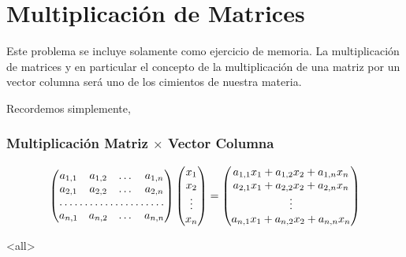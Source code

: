 \section{Multiplicación de Matrices}


Este problema se incluye solamente como 
ejercicio de memoria. La multiplicación de matrices
y en particular el concepto de la multiplicación 
de una matriz por un vector columna será uno de 
los cimientos de nuestra materia. 

Recordemos simplemente, 

\mode*
\begin{frame}[label=FrameEquationMatMul]
  \frametitle<presentation>{Multiplicación Matriz $\times$ Vector Columna}

  \begin{equation}
    \begin{pmatrix}
      a_{1,1} & a_{1,2} & \dots & a_{1,n}  \\
	   a_{2,1} & a_{2,2} & \dots & a_{2,n} \\
	   \hdotsfor{4} \\
	   a_{n,1} & a_{n,2} & \dots & a_{n,n} 
    \end{pmatrix}
    \begin{pmatrix}
      x_{1} \\ x_{2} \\ \vdots \\ x_n 
    \end{pmatrix}
  =
    \begin{pmatrix}
      a_{1,1} x_1 +  a_{1,2} x_2 +  a_{1,n} x_n  \\
      a_{2,1} x_1 +  a_{2,2} x_2 +  a_{2,n} x_n  \\
      \vdots \\
      a_{n,1} x_1 +  a_{n,2} x_2 +  a_{n,n} x_n 
    \end{pmatrix}
  \end{equation}
%
%
%



\end{frame}

\mode<all>

